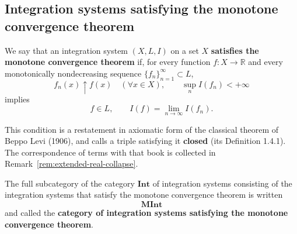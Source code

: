 \subsection{Integration systems satisfying the monotone convergence theorem}

\begin{definition}\label{def:satisfies-mct}
  We say that an integration system $(X,L,I)$ on a set $X$
  \textbf{satisfies the monotone convergence theorem} if, for every function
  $f:X\to\mathbb{R}$ and every monotonically nondecreasing sequence
  $\{f_n\}_{n=1}^{\infty}\subset L$,
  \[
    f_n(x)\uparrow f(x)\quad(\forall x\in X),\qquad\sup_n I(f_n)<+\infty
  \]
  implies
  \[
    f\in L,\qquad I(f)=\lim_{n\to\infty} I(f_n) .
  \]
\end{definition}

\noindent
This condition is a restatement in axiomatic form of the classical theorem of
Beppo Levi (1906), and \cite{CWS} calls a triple satisfying it \textbf{closed}
(its Definition 1.4.1).
The correspondence of terms with that book is collected in
Remark~\ref{rem:extended-real-collapse}.

\begin{definition}
  The full subcategory of the category $\mathbf{Int}$ of integration systems
  consisting of the integration systems that satisfy the monotone convergence
  theorem is written
  \[
    \mathbf{MInt}
  \]
  and called the \textbf{category of integration systems satisfying the monotone
  convergence theorem}.
\end{definition}
